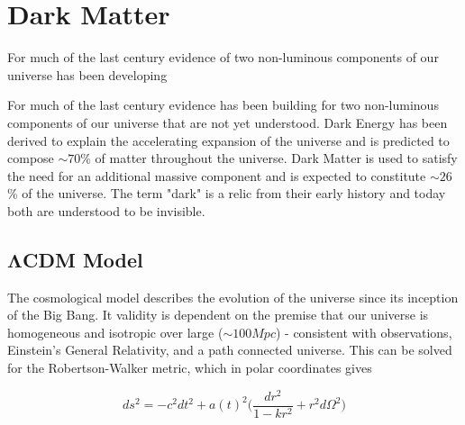




\pagestyle{cu}
\graphicspath{{./Chapter1/Figures/}}
\chapter[Dark Matter][Dark Matter]{Dark Matter}

For much of the last century evidence of two non-luminous components of our universe has been developing

For much of the last century evidence has been building for two non-luminous components of our universe that are not yet understood.
Dark Energy has been derived to explain the accelerating expansion of the universe and is predicted to compose $\sim70$\% of
matter throughout the universe.  Dark Matter is used to satisfy the need for an additional massive component and is expected to
constitute $\sim26$ \% of the universe.  The term "dark" is a relic from their early history and today both are understood to be
invisible.



\section[$\Lambda$ CDM Model][$\Lambda$ CDM Model]{$\boldsymbol{\Lambda}$CDM Model}
The cosmological model describes the evolution of the universe since its inception of the Big Bang.  It validity is dependent
on the premise that our universe is homogeneous and isotropic over large ($\sim 100 Mpc$) - consistent with observations,
Einstein's General Relativity, and a path connected universe.  This can be solved for the Robertson-Walker metric, which in
polar coordinates gives

\begin{equation}
ds^{2} = -c^{2}dt^{2} + a(t)^{2} \bigg( \frac{dr^{2}}{1 - kr^{2}} + r^{2}d\Omega^{2} \bigg)
\end{equation}

